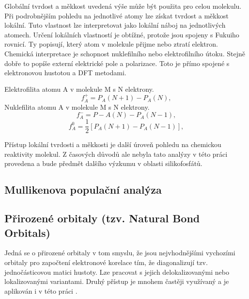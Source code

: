 \documentclass[
digital, %
table,   %
lof,     %
lot,     %
oneside,
]{fithesis3}
\begin{document}
Globální tvrdost a měkkost uvedená výše může být použita pro celou molekulu. Při podrobnějším pohledu na jednotlivé atomy lze získat tvrdost a měkkost lokální. Tuto vlastnost lze interpretovat jako lokální náboj na jednotlivých atomech. Určení lokálních vlastností je obtížné, protože jsou spojeny s Fukuiho rovnicí. Ty popisují, který atom v molekule přijme nebo ztratí elektron. Chemická interpretace je schopnost nuklefilního nebo elektrofilního útoku. Stejně dobře to popíše externí elektrické pole a polarizace. Toto je přímo spojené s elektronovou hustotou a DFT metodami.

Elektrofilita atomu A v molekule M s N elektrony.
\begin{equation}
f_A^+ = P_A(N+1) - P_A(N),
\end{equation}
Nuklefilita atomu A v molekule M s N elektrony.
\begin{equation}
f_A^- = P-A(N) - P_A(N-1),
\end{equation}
\begin{equation}
f_A^0 = \frac{1}{2}[P_A(N+1) - P_A(N-1)],
\end{equation}

Přístup lokální tvrdosti a měkkosti je další úroveň pohledu na chemickou reaktivity molekul. Z časových důvodů ale nebyla tato analýzy v této práci provedena a bude předmět dalšího výzkumu v oblasti silikofosfátů.

\subsection{Mullikenova populační analýza}

\subsection{Přirozené orbitaly (tzv. Natural Bond Orbitals)}
Jedná se o přirozené orbitaly v tom smyslu, že jsou nejvhodnějšími vychozími orbitaly pro započtení elektronové korelace tím, že diagonalizují tzv. jednočásticovou matici hustoty. Lze pracovat s jejich delokalizovanými nebo lokalizovanými variantami. Druhý přístup je mnohem častěji využívaný a je aplikován i v této práci \cite{weinhold2005valency}.
\end{document}

